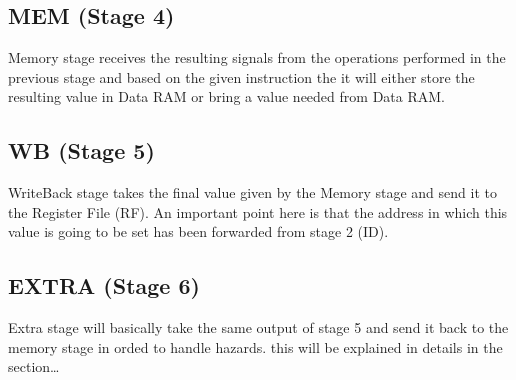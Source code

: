 \subsection[MEM (Stage 4)]{MEM (Stage 4)}
Memory stage receives the resulting signals from the operations performed in the previous stage and based on the given instruction
the it will either store the resulting value in Data RAM or bring a value needed from Data RAM.

\subsection[WB (Stage 5)]{WB (Stage 5)}
WriteBack stage takes the final value given by the Memory stage and send it to the Register File (RF). An important point here is
that the address in which this value is going to be set has been forwarded from stage 2 (ID).

\subsection[EXTRA (Stage 6)]{EXTRA (Stage 6)}
Extra stage will basically take the same output of stage 5 and send it back to the memory stage in orded to handle hazards. this will be explained in details in the section… 

